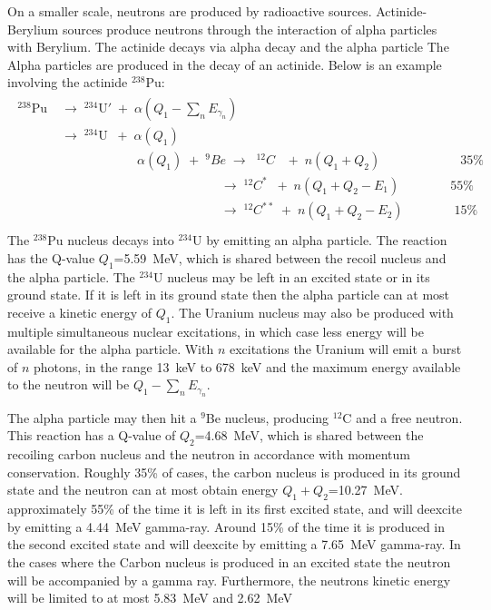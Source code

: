 \documentclass[main.tex]{subfiles}
\begin{document}
On a smaller scale, neutrons are produced by radioactive sources. Actinide-Berylium sources produce neutrons through the interaction of alpha particles with Berylium. The actinide decays via alpha decay and the alpha particle The Alpha particles are produced in the decay of an actinide. Below is an example involving the actinide $^\textit{238}$Pu:
\begin{align}
	\begin{split}	
		^\textrm{238}\textrm{Pu}\;&\rightarrow\;^{\textrm{234}}\textrm{U}'\;+\;\alpha\left(Q_1-\textstyle\sum_n E_{\gamma_n}\right)\\
		&\rightarrow\;^{\textrm{234}}\textrm{U}\;\;+\;\alpha(Q_1)\\
		&\phantom{\qquad\qquad\qquad}\alpha(Q_1) \;+\; ^{9}Be \;\rightarrow\;\; ^{12}C \;\;\;+\; n(Q_1+Q_2)\qquad\qquad\qquad\; 35\%\\
		&\phantom{\qquad\qquad\qquad\qquad\qquad\qquad\;\;}\rightarrow\;^{12}C^* \;\;+\; n(Q_1+Q_2- E_1)\qquad \qquad 55\%\\
		&\phantom{\qquad\qquad\qquad\qquad\qquad\qquad\;\;}\rightarrow\;^{12}C^{**} \;+\; n(Q_1+Q_2- E_2)\qquad\qquad 15\%\\
	\label{eq:actinide}
	\end{split}
\end{align}	
The $^\textit{238}$Pu nucleus decays into $^\textit{234}$U by emitting an alpha particle. The reaction has the Q-value $Q_1$=\SI{5.59}{\MeV}, which is shared between the recoil nucleus and the alpha particle. The $^\textit{234}$U nucleus may be left in an excited state or in its ground state. If it is left in its ground state then the alpha particle can at most receive a kinetic energy of $Q_1$. The Uranium nucleus may also be produced with multiple simultaneous nuclear excitations, in which case less energy will be available for the alpha particle. With $n$ excitations the Uranium will emit a burst of $n$ photons, in the range \SI{13}{keV} to \SI{678}{keV} and the maximum energy available to the neutron will be $Q_1-\textstyle\sum_n E_{\gamma_n}$.

The alpha particle may then hit a $^{\textrm{9}}$Be nucleus, producing $^{12}$C and a free neutron. This reaction has a Q-value of $Q_2$=\SI{4.68}{\MeV}, which is shared between the recoiling carbon nucleus and the neutron in accordance with momentum conservation. Roughly 35\% of cases, the carbon nucleus is produced in its ground state and the neutron can at most obtain energy $Q_1+Q_2$=\SI{10.27}{\MeV}. approximately 55\% of the time it is left in its first excited state, and will deexcite by emitting a \SI{4.44}{\MeV} gamma-ray. Around 15\% of the time it is produced in the second excited state and will deexcite by emitting a \SI{7.65}{\MeV} gamma-ray\cite{nudat}\cite{Scherzinger2017}. In the cases where the Carbon nucleus is produced in an excited state the neutron will be accompanied by a gamma ray. Furthermore, the neutrons kinetic energy will be limited to at most \SI{5.83}{\MeV} and \SI{2.62}{\MeV}
\end{document}
